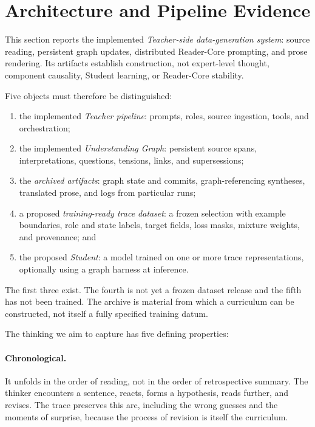 \section{Architecture and Pipeline Evidence}\label{sec:architecture}

This section reports the implemented \emph{Teacher-side data-generation system}:
source reading, persistent graph updates, distributed Reader-Core prompting, and
prose rendering. Its artifacts establish construction, not expert-level thought,
component causality, Student learning, or Reader-Core stability.

Five objects must therefore be distinguished:

\begin{enumerate}[leftmargin=*,itemsep=0.35em]
    \item the implemented \emph{Teacher pipeline}: prompts, roles, source
    ingestion, tools, and orchestration;
    \item the implemented \emph{Understanding Graph}: persistent source spans,
    interpretations, questions, tensions, links, and supersessions;
    \item the \emph{archived artifacts}: graph state and commits,
    graph-referencing syntheses, translated prose, and logs from particular runs;
    \item a proposed \emph{training-ready trace dataset}: a frozen selection
    with example boundaries, role and state labels, target fields, loss masks,
    mixture weights, and provenance; and
    \item the proposed \emph{Student}: a model trained on one or more trace
    representations, optionally using a graph harness at inference.
\end{enumerate}

The first three exist. The fourth is not yet a frozen dataset release and the
fifth has not been trained. The archive is material from which a curriculum can
be constructed, not itself a fully specified training datum.

The thinking we aim to capture has five defining properties:

\paragraph{Chronological.} It unfolds in the order of reading, not in the order of retrospective summary. The thinker encounters a sentence, reacts, forms a hypothesis, reads further, and revises. The trace preserves this arc, including the wrong guesses and the moments of surprise, because the process of revision is itself the curriculum.

